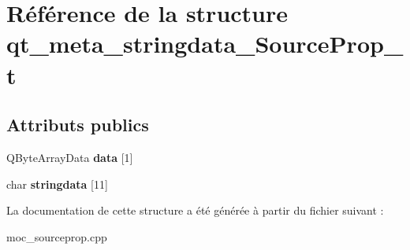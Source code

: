 \hypertarget{structqt__meta__stringdata__SourceProp__t}{\section{Référence de la structure qt\+\_\+meta\+\_\+stringdata\+\_\+\+Source\+Prop\+\_\+t}
\label{structqt__meta__stringdata__SourceProp__t}
}
\subsection*{Attributs publics}
\begin{DoxyCompactItemize}
\item 
\hypertarget{structqt__meta__stringdata__SourceProp__t_a638945b97830f091977955928a6bb201}{Q\+Byte\+Array\+Data {\bfseries data} \mbox{[}1\mbox{]}}\label{structqt__meta__stringdata__SourceProp__t_a638945b97830f091977955928a6bb201}

\item 
\hypertarget{structqt__meta__stringdata__SourceProp__t_ac0f2873b57de9e9a348a87ce341ab0a6}{char {\bfseries stringdata} \mbox{[}11\mbox{]}}\label{structqt__meta__stringdata__SourceProp__t_ac0f2873b57de9e9a348a87ce341ab0a6}

\end{DoxyCompactItemize}


La documentation de cette structure a été générée à partir du fichier suivant \+:\begin{DoxyCompactItemize}
\item 
moc\+\_\+sourceprop.\+cpp\end{DoxyCompactItemize}
